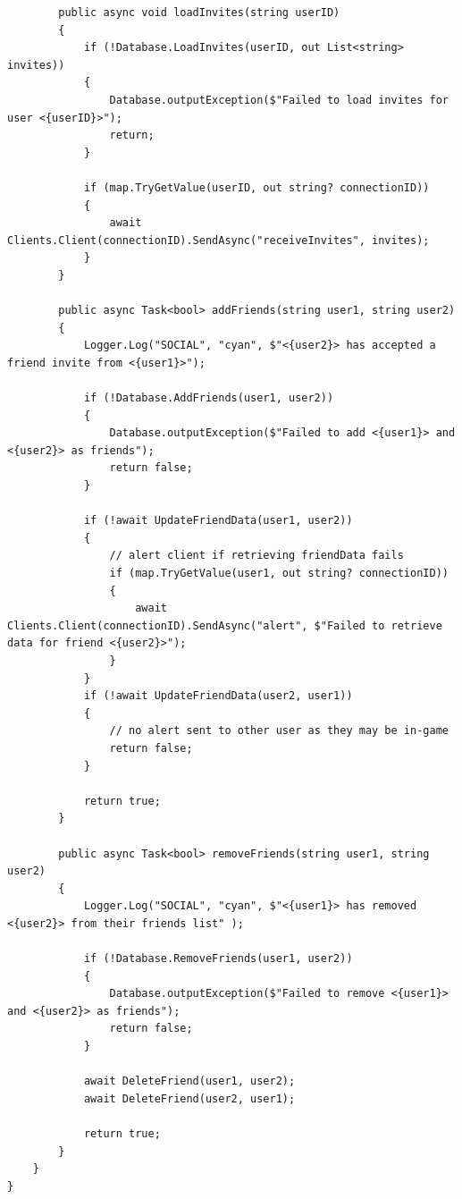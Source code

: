 \documentclass{article}
\begin{document}
\begin{verbatim}
        public async void loadInvites(string userID)
        {
            if (!Database.LoadInvites(userID, out List<string> invites))
            {
                Database.outputException($"Failed to load invites for user <{userID}>");
                return;
            }

            if (map.TryGetValue(userID, out string? connectionID))
            {
                await Clients.Client(connectionID).SendAsync("receiveInvites", invites);
            }
        }

        public async Task<bool> addFriends(string user1, string user2)
        {
            Logger.Log("SOCIAL", "cyan", $"<{user2}> has accepted a friend invite from <{user1}>");

            if (!Database.AddFriends(user1, user2))
            {
                Database.outputException($"Failed to add <{user1}> and <{user2}> as friends");
                return false;
            }

            if (!await UpdateFriendData(user1, user2))
            {
                // alert client if retrieving friendData fails
                if (map.TryGetValue(user1, out string? connectionID))
                {
                    await Clients.Client(connectionID).SendAsync("alert", $"Failed to retrieve data for friend <{user2}>");
                }
            }
            if (!await UpdateFriendData(user2, user1))
            {
                // no alert sent to other user as they may be in-game
                return false;
            }

            return true;
        }

        public async Task<bool> removeFriends(string user1, string user2)
        {
            Logger.Log("SOCIAL", "cyan", $"<{user1}> has removed <{user2}> from their friends list" );

            if (!Database.RemoveFriends(user1, user2))
            {
                Database.outputException($"Failed to remove <{user1}> and <{user2}> as friends");
                return false;
            }

            await DeleteFriend(user1, user2);
            await DeleteFriend(user2, user1);

            return true;
        }
    }
}
\end{verbatim}
\end{document}

